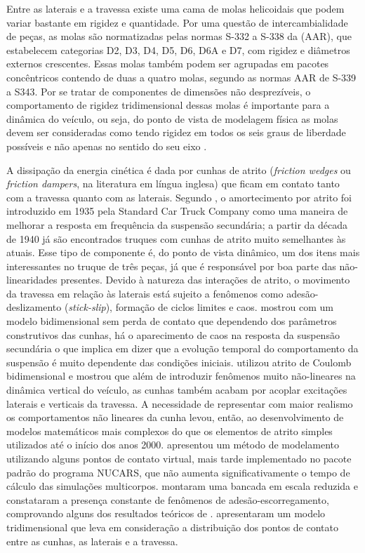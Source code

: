 Entre as laterais e a travessa existe uma cama de molas helicoidais que podem variar bastante em rigidez e quantidade. Por uma questão de intercambialidade de peças, as molas são normatizadas pelas normas S-332 a S-338 da \citeauthor{association_of_american_railroads_section_2019} (AAR), que estabelecem categorias D2, D3, D4, D5, D6, D6A e D7, com rigidez e diâmetros externos crescentes. Essas molas também podem ser agrupadas em pacotes concêntricos contendo de duas a quatro molas, segundo as normas AAR de S-339 a S343. Por se tratar de componentes de dimensões não desprezíveis, o comportamento de rigidez tridimensional dessas molas é importante para a dinâmica do veículo, ou seja, do ponto de vista de modelagem física as molas devem ser consideradas como tendo rigidez em todos os seis graus de liberdade possíveis e não apenas no sentido do seu eixo \cite{baruffaldi_effects_2017}.

A dissipação da energia cinética é dada por cunhas de atrito (\textit{friction wedges} ou \textit{friction dampers}, na literatura em língua inglesa) que ficam em contato tanto com a travessa quanto com as laterais. Segundo , o amortecimento por atrito foi introduzido em 1935 pela Standard Car Truck Company como uma maneira de melhorar a resposta em frequência da suspensão secundária; a partir da década de 1940 já são encontrados truques com cunhas de atrito muito semelhantes às atuais. Esse tipo de componente é, do ponto de vista dinâmico, um dos itens mais interessantes no truque de três peças, já que é responsável por boa parte das não-linearidades presentes. Devido à natureza das interações de atrito, o movimento da travessa em relação às laterais está sujeito a fenômenos como adesão-deslizamento (\textit{stick-slip}), formação de ciclos limites e caos.  mostrou com um modelo bidimensional sem perda de contato que dependendo dos parâmetros construtivos das cunhas, há o aparecimento de caos na resposta da suspensão secundária o que implica em dizer que a evolução temporal do comportamento da suspensão é muito dependente das condições iniciais. \cite{xia_modelling_2002} utilizou atrito de Coulomb bidimensional e mostrou que além de introduzir fenômenos muito não-lineares na dinâmica vertical do veículo, as cunhas também acabam por acoplar excitações laterais e verticais da travessa. A necessidade de representar com maior realismo os comportamentos não lineares da cunha levou, então, ao desenvolvimento de modelos matemáticos mais complexos do que os elementos de atrito simples utilizados até o início dos anos 2000.  apresentou um método de modelamento utilizando alguns pontos de contato virtual, mais tarde implementado no pacote padrão do programa NUCARS, que não aumenta significativamente o tempo de cálculo das simulações multicorpos.  montaram uma bancada em escala reduzida e constataram a presença constante de fenômenos de adesão-escorregamento, comprovando alguns dos resultados teóricos de \citeauthor{kaiser_modeling_2002}.  apresentaram um modelo tridimensional que leva em consideração a distribuição dos pontos de contato entre as cunhas, as laterais e a travessa.

